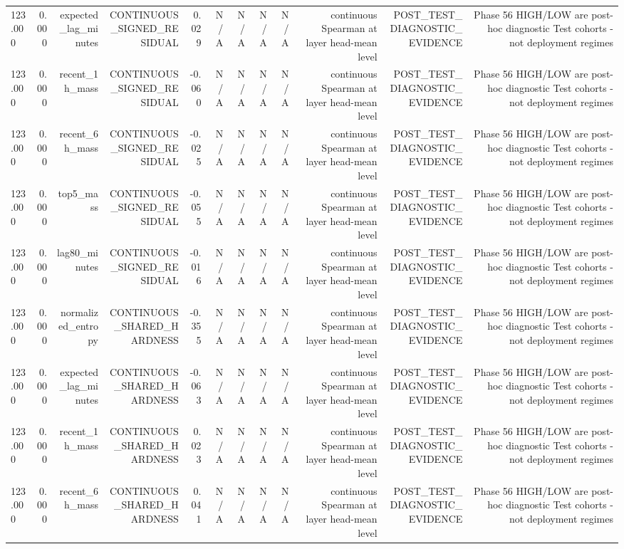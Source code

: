 \begin{table}[h!]
\begin{tabular}{lrrrrrrrrrrr}
123.000 & 0.000 & expected\_lag\_minutes & CONTINUOUS\_SIGNED\_RESIDUAL & 0.029 & N/A & N/A & N/A & N/A & continuous Spearman at layer head-mean level & POST\_TEST\_DIAGNOSTIC\_EVIDENCE & Phase 56 HIGH/LOW are post-hoc diagnostic Test cohorts - not deployment regimes \\
123.000 & 0.000 & recent\_1h\_mass & CONTINUOUS\_SIGNED\_RESIDUAL & -0.060 & N/A & N/A & N/A & N/A & continuous Spearman at layer head-mean level & POST\_TEST\_DIAGNOSTIC\_EVIDENCE & Phase 56 HIGH/LOW are post-hoc diagnostic Test cohorts - not deployment regimes \\
123.000 & 0.000 & recent\_6h\_mass & CONTINUOUS\_SIGNED\_RESIDUAL & -0.025 & N/A & N/A & N/A & N/A & continuous Spearman at layer head-mean level & POST\_TEST\_DIAGNOSTIC\_EVIDENCE & Phase 56 HIGH/LOW are post-hoc diagnostic Test cohorts - not deployment regimes \\
123.000 & 0.000 & top5\_mass & CONTINUOUS\_SIGNED\_RESIDUAL & -0.055 & N/A & N/A & N/A & N/A & continuous Spearman at layer head-mean level & POST\_TEST\_DIAGNOSTIC\_EVIDENCE & Phase 56 HIGH/LOW are post-hoc diagnostic Test cohorts - not deployment regimes \\
123.000 & 0.000 & lag80\_minutes & CONTINUOUS\_SIGNED\_RESIDUAL & -0.016 & N/A & N/A & N/A & N/A & continuous Spearman at layer head-mean level & POST\_TEST\_DIAGNOSTIC\_EVIDENCE & Phase 56 HIGH/LOW are post-hoc diagnostic Test cohorts - not deployment regimes \\
123.000 & 0.000 & normalized\_entropy & CONTINUOUS\_SHARED\_HARDNESS & -0.355 & N/A & N/A & N/A & N/A & continuous Spearman at layer head-mean level & POST\_TEST\_DIAGNOSTIC\_EVIDENCE & Phase 56 HIGH/LOW are post-hoc diagnostic Test cohorts - not deployment regimes \\
123.000 & 0.000 & expected\_lag\_minutes & CONTINUOUS\_SHARED\_HARDNESS & -0.063 & N/A & N/A & N/A & N/A & continuous Spearman at layer head-mean level & POST\_TEST\_DIAGNOSTIC\_EVIDENCE & Phase 56 HIGH/LOW are post-hoc diagnostic Test cohorts - not deployment regimes \\
123.000 & 0.000 & recent\_1h\_mass & CONTINUOUS\_SHARED\_HARDNESS & 0.023 & N/A & N/A & N/A & N/A & continuous Spearman at layer head-mean level & POST\_TEST\_DIAGNOSTIC\_EVIDENCE & Phase 56 HIGH/LOW are post-hoc diagnostic Test cohorts - not deployment regimes \\
123.000 & 0.000 & recent\_6h\_mass & CONTINUOUS\_SHARED\_HARDNESS & 0.041 & N/A & N/A & N/A & N/A & continuous Spearman at layer head-mean level & POST\_TEST\_DIAGNOSTIC\_EVIDENCE & Phase 56 HIGH/LOW are post-hoc diagnostic Test cohorts - not deployment regimes \\

\end{tabular}
\end{table}
